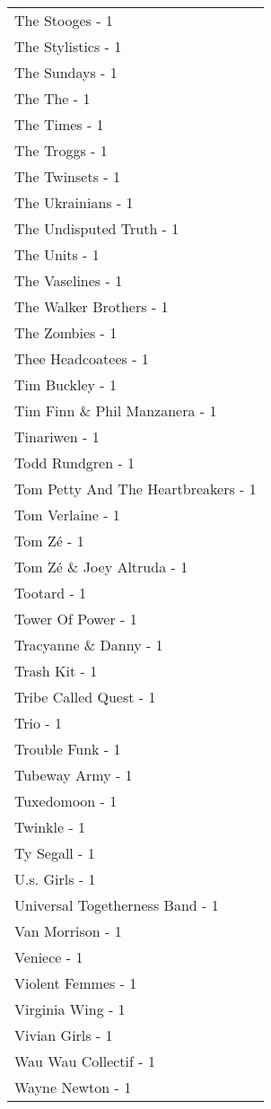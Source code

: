 \documentclass[
]{article}
\begin{document}
\begin{longtable}{l}
The Stooges - 1 \\ 
The Stylistics - 1 \\ 
The Sundays - 1 \\ 
The The - 1 \\ 
The Times - 1 \\ 
The Troggs - 1 \\ 
The Twinsets - 1 \\ 
The Ukrainians - 1 \\ 
The Undisputed Truth - 1 \\ 
The Units - 1 \\ 
The Vaselines - 1 \\ 
The Walker Brothers - 1 \\ 
The Zombies - 1 \\ 
Thee Headcoatees - 1 \\ 
Tim Buckley - 1 \\ 
Tim Finn \& Phil Manzanera - 1 \\ 
Tinariwen - 1 \\ 
Todd Rundgren - 1 \\ 
Tom Petty And The Heartbreakers - 1 \\ 
Tom Verlaine - 1 \\ 
Tom Zé - 1 \\ 
Tom Zé \& Joey Altruda - 1 \\ 
Tootard - 1 \\ 
Tower Of Power - 1 \\ 
Tracyanne \& Danny - 1 \\ 
Trash Kit - 1 \\ 
Tribe Called Quest - 1 \\ 
Trio - 1 \\ 
Trouble Funk - 1 \\ 
Tubeway Army - 1 \\ 
Tuxedomoon - 1 \\ 
Twinkle - 1 \\ 
Ty Segall - 1 \\ 
U.s. Girls - 1 \\ 
Universal Togetherness Band - 1 \\ 
Van Morrison - 1 \\ 
Veniece - 1 \\ 
Violent Femmes - 1 \\ 
Virginia Wing - 1 \\ 
Vivian Girls - 1 \\ 
Wau Wau Collectif - 1 \\ 
Wayne Newton - 1 \\ 

\end{longtable}
\end{document}
